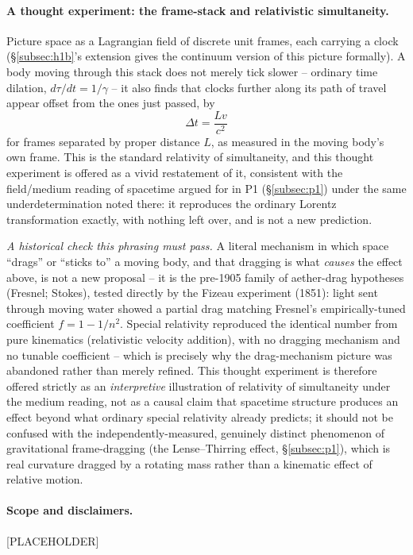 \documentclass[12pt, a4paper]{article}
\begin{document}
\paragraph{A thought experiment: the frame-stack and relativistic
simultaneity.} Picture space as a Lagrangian field of discrete unit
frames, each carrying a clock (\S\ref{subsec:h1b}'s extension gives
the continuum version of this picture formally). A body moving
through this stack does not merely tick slower -- ordinary time
dilation, $d\tau/dt=1/\gamma$ -- it also finds that clocks further
along its path of travel appear offset from the ones just passed, by
\[
  \Delta t = \frac{Lv}{c^2}
\]
for frames separated by proper distance $L$, as measured in the
moving body's own frame. This is the standard relativity of
simultaneity, and this thought experiment is offered as a vivid
restatement of it, consistent with the field/medium reading of
spacetime argued for in P1 (\S\ref{subsec:p1}) under the same
underdetermination noted there: it reproduces the ordinary Lorentz
transformation exactly, with nothing left over, and is not a new
prediction.

\emph{A historical check this phrasing must pass.} A literal
mechanism in which space ``drags'' or ``sticks to'' a moving body,
and that dragging is what \emph{causes} the effect above, is not a
new proposal -- it is the pre-1905 family of aether-drag hypotheses
(Fresnel; Stokes), tested directly by the Fizeau experiment (1851):
light sent through moving water showed a partial drag matching
Fresnel's empirically-tuned coefficient $f=1-1/n^2$. Special
relativity reproduced the identical number from pure kinematics
(relativistic velocity addition), with no dragging mechanism and no
tunable coefficient -- which is precisely why the drag-mechanism
picture was abandoned rather than merely refined. This thought
experiment is therefore offered strictly as an \emph{interpretive}
illustration of relativity of simultaneity under the medium reading,
not as a causal claim that spacetime structure produces an effect
beyond what ordinary special relativity already predicts; it should
not be confused with the independently-measured, genuinely distinct
phenomenon of gravitational frame-dragging (the Lense--Thirring
effect, \S\ref{subsec:p1}), which is real curvature dragged by a
rotating mass rather than a kinematic effect of relative motion.

\paragraph{Scope and disclaimers.}
[PLACEHOLDER]
\end{document}
